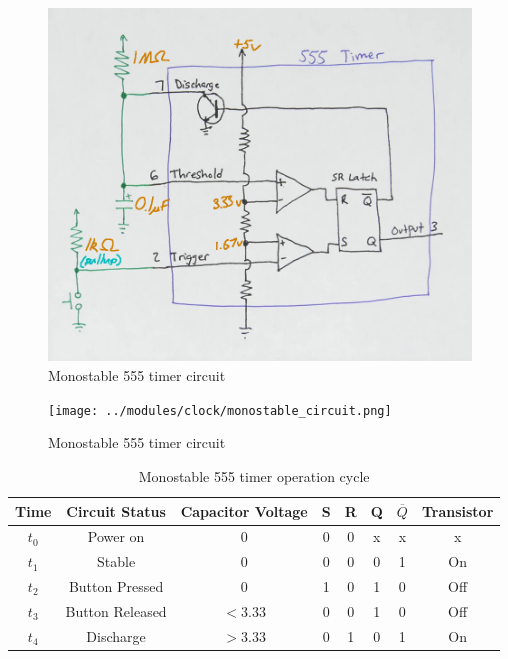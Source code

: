 \documentclass[12pt]{article}
\begin{document}
\begin{FlushLeft}
\begin{figure}[h]
  \begin{center}
    \includegraphics[width=0.8\linewidth]{../modules/clock/monostable_circuit_diagram.png}
    \caption{Monostable 555 timer circuit}
    \label{fig:monostable_circuit_diagram}
  \end{center}
\end{figure}

\begin{figure}[h]
  \begin{center}
    \texttt{[image: ../modules/clock/monostable\_circuit.png]}
    \caption{Monostable 555 timer circuit}
    \label{fig:monostable_circuit}
  \end{center}
\end{figure}

\begin{table}[ht]
  \begin{center}
    \begin{tabular}{ c | c c c c c c c }
      Time & Circuit Status & Capacitor Voltage & S & R & Q & $\overline Q$ & Transistor \\
      \hline
      $t_0$ & Power on        & 0       & 0 & 0 & x & x & x    \\
      $t_1$ & Stable          & 0       & 0 & 0 & 0 & 1 & On   \\
      $t_2$ & Button Pressed  & 0       & 1 & 0 & 1 & 0 & Off  \\
      $t_3$ & Button Released & $<3.33$ & 0 & 0 & 1 & 0 & Off  \\
      $t_4$ & Discharge       & $>3.33$ & 0 & 1 & 0 & 1 & On   \\
    \end{tabular}
    \caption{Monostable 555 timer operation cycle}
    \label{tab:monostable_cycle}
  \end{center}
\end{table}


\end{FlushLeft}
\end{document}
